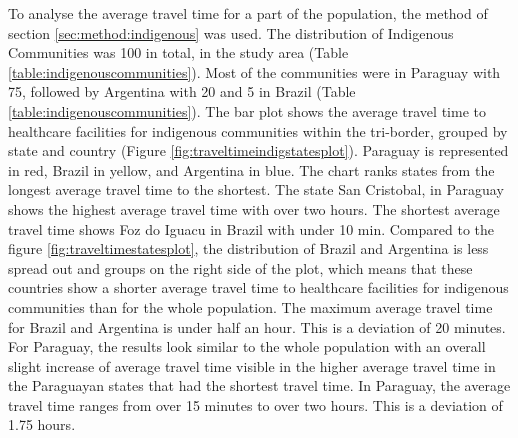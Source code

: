 \documentclass[11pt, a4paper]{report}
\begin{document}
To analyse the average travel time for a part of the population, the method of section \ref{sec:method:indigenous} was used. The distribution of Indigenous Communities was 100 in total, in the study area (Table \ref{table:indigenouscommunities}). Most of the communities were in Paraguay with 75, followed by Argentina with 20 and 5 in Brazil (Table \ref{table:indigenouscommunities}). The bar plot shows the average travel time to healthcare facilities for indigenous communities within the tri-border, grouped by state and country (Figure \ref{fig:traveltimeindigstatesplot}). Paraguay is represented in red, Brazil in yellow, and Argentina in blue. The chart ranks states from the longest average travel time to the shortest. The state San Cristobal, in Paraguay shows the highest average travel time with over two hours. The shortest average travel time shows Foz do Iguacu in Brazil with under 10 min. Compared to the figure \ref{fig:traveltimestatesplot}, the distribution of Brazil and Argentina is less spread out and groups on the right side of the plot, which means that these countries show a shorter average travel time to healthcare facilities for indigenous communities than for the whole population. The maximum average travel time for Brazil and Argentina is under half an hour. This is a deviation of 20 minutes. For Paraguay, the results look similar to the whole population with an overall slight increase of average travel time visible in the higher average travel time in the Paraguayan states that had the shortest travel time. In Paraguay, the average travel time ranges from over 15 minutes  to over two hours. This is a deviation of 1.75 hours. 
\end{document}
